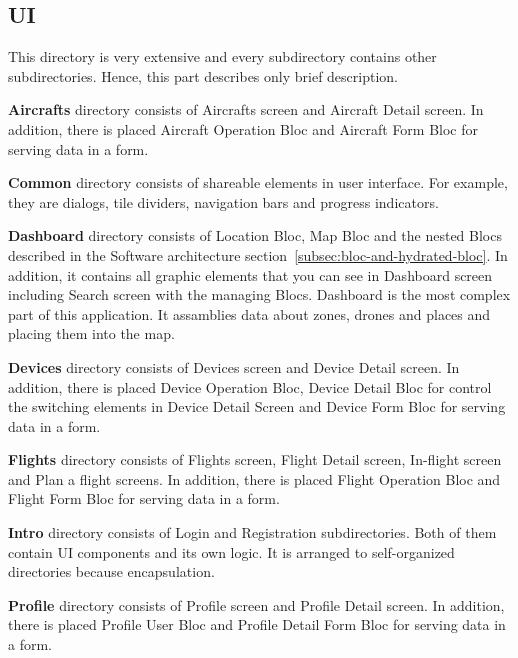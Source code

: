 \subsection{UI}\label{subsec:ui}
This directory is very extensive and every subdirectory contains other subdirectories.
Hence, this part describes only brief description.


\textbf{Aircrafts} directory consists of Aircrafts screen and Aircraft Detail screen.
In addition, there is placed Aircraft Operation Bloc and Aircraft Form Bloc for serving data in a form.


\textbf{Common} directory consists of shareable elements in user interface.
For example, they are dialogs, tile dividers, navigation bars and progress indicators.


\textbf{Dashboard} directory consists of Location Bloc, Map Bloc and the nested Blocs described in the Software architecture section~\ref{subsec:bloc-and-hydrated-bloc}.
In addition, it contains all graphic elements that you can see in Dashboard screen including Search screen with the managing Blocs.
Dashboard is the most complex part of this application.
It assamblies data about zones, drones and places and placing them into the map.


\textbf{Devices} directory consists of Devices screen and Device Detail screen.
In addition, there is placed Device Operation Bloc, Device Detail Bloc for control the switching elements in Device Detail Screen and Device Form Bloc for serving data in a form.


\textbf{Flights} directory consists of Flights screen, Flight Detail screen, In-flight screen and Plan a flight screens.
In addition, there is placed Flight Operation Bloc and Flight Form Bloc for serving data in a form.


\textbf{Intro} directory consists of Login and Registration subdirectories.
Both of them contain UI components and its own logic.
It is arranged to self-organized directories because encapsulation.


\textbf{Profile} directory consists of Profile screen and Profile Detail screen.
In addition, there is placed Profile User Bloc and Profile Detail Form Bloc for serving data in a form.

